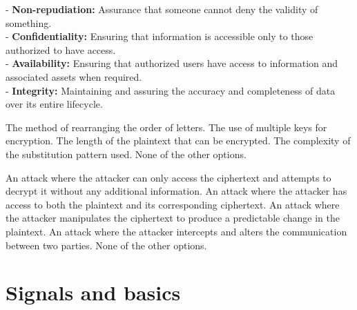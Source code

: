 \begin{questions}
    \begin{solution}
        - \textbf{Non-repudiation:} Assurance that someone cannot deny the validity of something. \\
        - \textbf{Confidentiality:} Ensuring that information is accessible only to those authorized to have access. \\
        - \textbf{Availability:} Ensuring that authorized users have access to information and associated assets when required. \\
        - \textbf{Integrity:} Maintaining and assuring the accuracy and completeness of data over its entire lifecycle. \\
    \end{solution}

    \begin{checkboxes}
        \choice The method of rearranging the order of letters.
        \choice The use of multiple keys for encryption.
        \choice The length of the plaintext that can be encrypted.
        \CorrectChoice The complexity of the substitution pattern used.
        \choice None of the other options.
    \end{checkboxes}

    \begin{checkboxes}
        \CorrectChoice An attack where the attacker can only access the ciphertext and attempts to decrypt it without any additional information.
        \choice An attack where the attacker has access to both the plaintext and its corresponding ciphertext.
        \choice An attack where the attacker manipulates the ciphertext to produce a predictable change in the plaintext.
        \choice An attack where the attacker intercepts and alters the communication between two parties.
        \choice None of the other options.
    \end{checkboxes}

    \section{Signals and basics}



\end{questions}
